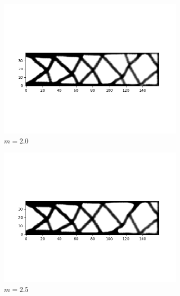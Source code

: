 \begin{figure}
\begin{subfigure}[t]{0.45\textwidth}
          \includegraphics[width=1\textwidth]{./images/robust_exact/exact_svd_mean_20std_csimp.png}
          \caption{$m = 2.0$}
        \end{subfigure}
        \begin{subfigure}[t]{0.45\textwidth}
          \centering
          \includegraphics[width=1\textwidth]{./images/robust_exact/exact_svd_mean_25std_csimp.png}
          \caption{$m = 2.5$}
        \end{subfigure}
        \begin{subfigure}[t]{0.45\textwidth}
          \centering

\end{subfigure}
\end{figure}
